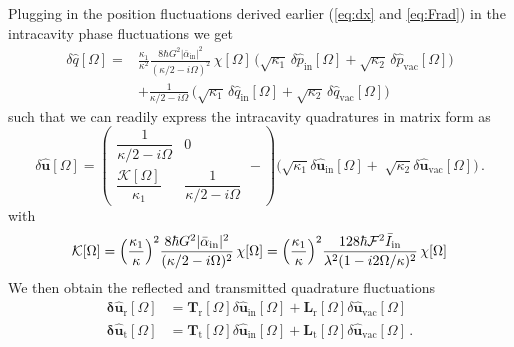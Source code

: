 Plugging in the position fluctuations derived earlier (\eqref{eq:dx} and \eqref{eq:Frad}) in the intracavity phase fluctuations we get
\begin{equation}
  \begin{split}
\delta \hat{q}[\Omega] =  &\frac{\kappa_{\mathrm{1}}}{\kappa^2} \frac{8\hbar G^2|\bar \alpha_{\textrm{in}}|^2}{(\kappa/2 - i\Omega)^2}  \,  \chi[\Omega] \, \bigg( \sqrt{\kappa_1} \, \delta \hat{p}_{\mathrm{in}}[\Omega] + \sqrt{\kappa_2} \, \delta \hat{p}_{\mathrm{vac}}[\Omega] \bigg) \\ 
 & +\frac{1}{\kappa/2 - i\Omega} \, \bigg( \sqrt{\kappa_1} \, \delta \hat{q}_{\mathrm{in}}[\Omega] + \sqrt{\kappa_2} \, \delta \hat{q}_{\mathrm{vac}}[\Omega] \bigg) 
  \end{split}
\end{equation}
such that we can readily express the intracavity quadratures in matrix form as
\begin{equation}
\delta\mathbf{\hat{\mathbf u}} [\Omega]
=
\left(
\begin{array}{cc}
\dfrac{1}{\kappa/2 - i\Omega} & 0\\[6pt]
\dfrac{\mathcal{K}[\Omega]}{\kappa_1} & \dfrac{1}{\kappa/2 - i\Omega}
\end{array}-
\right)
\bigg( 
\sqrt{\kappa_1} \delta\mathbf{\hat{\mathbf u}} _{\mathrm{in}}[\Omega] +\;
\sqrt{\kappa_2} \delta\mathbf{\hat{\mathbf u}} _{\mathrm{vac}}[\Omega] \bigg)  \, .
\end{equation}
with
\begin{equation*}
  \mathcal{K}[\Omega] = \Bigl(\dfrac{\kappa_{\mathrm{1}}}{\kappa}\Bigr)^2 \dfrac{8\hbar G^2|\bar \alpha_{\textrm{in}}|^2}{(\kappa/2 - i\Omega)^2}  \,  \chi[\Omega] = \Bigl(\dfrac{\kappa_{\mathrm{1}}}{\kappa}\Bigr)^2 \dfrac{128 \hbar \mathcal{F}^2 \bar I_{\rm in}}{\lambda^2(1 - i2\Omega/\kappa)^2}  \,  \chi[\Omega]
\end{equation*}
We then obtain the reflected and transmitted quadrature fluctuations 
\begin{equation}
\begin{split}
\mathbf{\delta \hat{u}_{\mathrm{r}}}[\Omega] &= 
\mathbf{T}_{\mathrm{r}}[\Omega]
\delta\hat{\mathbf u}_{\mathrm{in}}[\Omega] + 
\mathbf{L}_{\mathrm{r}}[\Omega]
\delta\hat{\mathbf u}_{\mathrm{vac}}[\Omega] \, \\ 
\mathbf{\delta \hat{u}_{\mathrm{t}}}[\Omega] &= \mathbf{T}_{\mathrm{t}}[\Omega]  \delta\hat{\mathbf u}_{\mathrm{in}}[\Omega] +
\mathbf{L}_{\mathrm{t}}[\Omega]
\delta\hat{\mathbf u}_{\mathrm{vac}}[\Omega] \, .
\end{split}
\end{equation}
